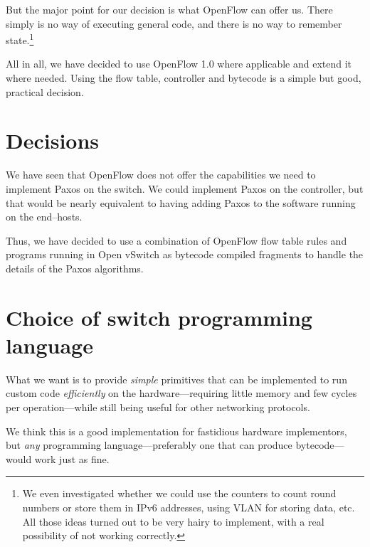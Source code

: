 But the major point for our decision is what OpenFlow can offer us.
There simply is no way of executing general code, and there is no way to
remember state.\footnote{We even investigated whether we could use the
counters to count round numbers or store them in IPv6 addresses, using VLAN
for storing data, etc.  All those ideas turned out to be very hairy to
implement, with a real possibility of not working correctly.}

All in all, we have decided to use OpenFlow 1.0 where applicable and extend
it where needed.  Using the flow table, controller and bytecode is a simple
but good, practical decision.

\section{Decisions}

We have seen that OpenFlow does not offer the capabilities we need to
implement Paxos on the switch.  We could implement Paxos on the controller,
but that would be nearly equivalent to having adding Paxos to the software
running on the end--hosts.

Thus, we have decided to use a combination of OpenFlow flow table rules and
programs running in Open vSwitch as bytecode compiled fragments to handle the
details of the Paxos algorithms.


\section{Choice of switch programming language}


What we want is to provide \textit{simple} primitives that can be
implemented to run custom code \textit{efficiently} on the
hardware---requiring little memory and few cycles per operation---while
still being useful for other networking protocols.

We think this is a good implementation for fastidious hardware implementors,
but \textit{any} programming language---preferably one that can produce
bytecode---would work just as fine.

